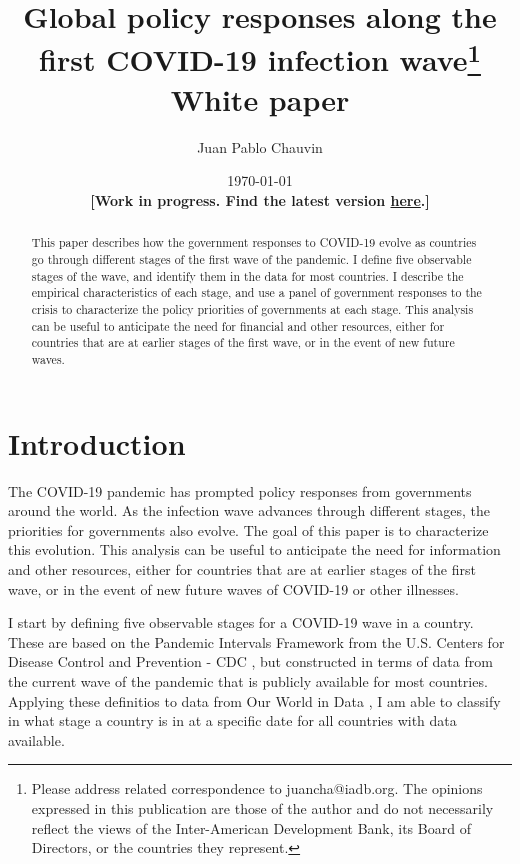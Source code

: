 \documentclass[12pt,english]{article}
\title{{\Large{}Global policy responses along the first COVID-19 infection wave\footnote{Please address related correspondence to juancha@iadb.org. The opinions expressed in this publication are those of the author and do not necessarily reflect the views of the Inter-American Development Bank, its Board of Directors, or the countries they represent.} \\ White paper}}
\author{Juan Pablo Chauvin}
\affil{Research Department, Inter-American Development Bank}
\begin{document}
\begin{titlepage}

  \date{\today\textbf{}\\
  \textbf{{[}Work in progress. Find the latest version \href{https://github.com/jpchauvin/covid_policies/blob/master/drafts/covid19_infection_wave_and_policies.pdf?raw=true}{here}.{]}}\\
  \vspace{-10bp}
  }

\maketitle
\begin{abstract}
\noindent

This paper describes how the government responses to  COVID-19 evolve as countries go through different stages of the first wave of the pandemic.  I define five observable stages of the wave, and identify them in the data for most countries. I describe the empirical characteristics of each stage, and use a panel of government responses to the crisis to characterize the policy priorities of governments at each stage. This analysis can be useful to anticipate the need for financial and other resources, either for countries that are at earlier stages of the first wave, or in the event of new future waves.


\bigskip
\end{abstract}
\setcounter{page}{0}
\thispagestyle{empty}
\end{titlepage}
\pagebreak \newpage


\onehalfspace


\section{Introduction}

The COVID-19 pandemic has prompted policy responses from governments around the world.  As the infection wave advances through different stages, the priorities for governments also evolve.  The goal of this paper is to characterize this evolution.  This analysis can be useful to anticipate the need for information and other resources, either for countries that are at earlier stages of the first wave, or in the event of new future waves of COVID-19 or other illnesses.

I start by defining five observable stages for a COVID-19 wave in a country.  These are based on the Pandemic Intervals Framework from the U.S. Centers for Disease Control and Prevention - CDC \citep{Holloway2014}, but constructed in terms of data from the current wave of the pandemic that is publicly available for most countries.  Applying these definitios to data from Our World in Data \citep{Roser2020}, I am able to classify in what stage a country is in at a specific date for all countries with data available.
\end{document}

